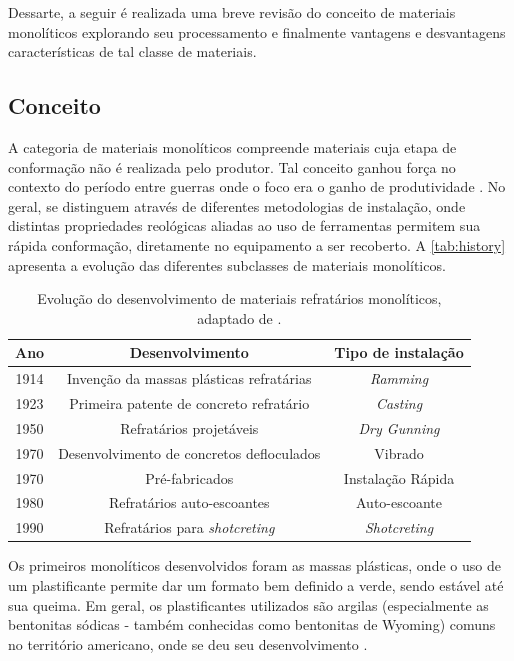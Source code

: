         Dessarte, a seguir é realizada uma breve revisão do conceito de materiais monolíticos explorando seu processamento e finalmente vantagens e desvantagens características de tal classe de materiais.

    \subsection{Conceito}
  	A categoria de materiais monolíticos compreende materiais cuja etapa de conformação não é realizada pelo produtor. Tal conceito ganhou força no  contexto do período entre guerras onde o foco era o ganho de produtividade \cite{Schacht2004}. No geral, se distinguem através de diferentes metodologias de instalação, onde distintas propriedades reológicas aliadas ao uso de ferramentas permitem sua rápida conformação, diretamente no equipamento a ser recoberto. A \autoref{tab:history} apresenta a evolução das diferentes subclasses de materiais monolíticos.
\begin{table}[!h] 
\centering
\caption{Evolução do desenvolvimento de materiais refratários monolíticos, adaptado de \cite{Schacht2004}.}
\begin{tabular}{ccc}
\hline
Ano  & Desenvolvimento                                         & Tipo de instalação                    \\
\hline
\hline
1914 & Invenção da massas plásticas refratárias                & \textit{Ramming}     \\ \hline
1923 & Primeira patente de concreto refratário                 & \textit{Casting}     \\ \hline
1950 & Refratários projetáveis                                 & \textit{Dry Gunning} \\ \hline
1970 & Desenvolvimento de concretos defloculados               & Vibrado                               \\ \hline
1970 & Pré-fabricados                                          & Instalação Rápida                     \\ \hline
1980 & Refratários auto-escoantes                              & Auto-escoante                         \\ \hline
1990 & Refratários para  \textit{shotcreting} & \textit{Shotcreting} \\ \hline
\end{tabular}
\label{tab:history}
\end{table}

	Os primeiros monolíticos desenvolvidos foram as massas plásticas, onde o uso de um plastificante permite dar um formato bem definido a verde, sendo estável até sua queima. Em geral, os plastificantes utilizados são argilas (especialmente as bentonitas sódicas  - também conhecidas como bentonitas de Wyoming) comuns no território americano, onde se deu seu desenvolvimento \cite{Schacht2004}.
    
